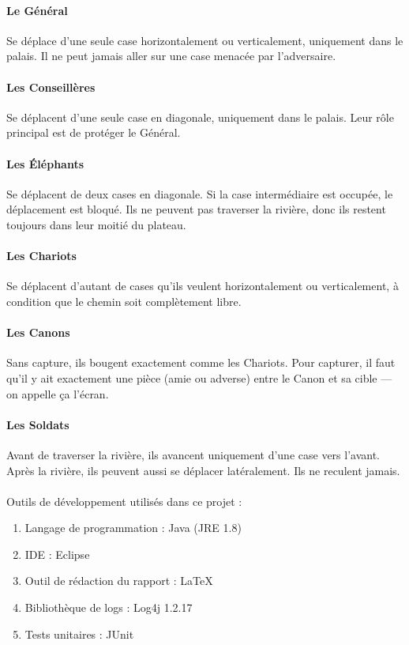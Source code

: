 \paragraph{Le Général} Se déplace d'une seule case horizontalement ou verticalement, uniquement dans le palais. Il ne peut jamais aller sur une case menacée par l'adversaire.
\paragraph{Les Conseillères} Se déplacent d'une seule case en diagonale, uniquement dans le palais. Leur rôle principal est de protéger le Général.
\paragraph{Les Éléphants} Se déplacent de deux cases en diagonale. Si la case intermédiaire est occupée, le déplacement est bloqué. Ils ne peuvent pas traverser la rivière, donc ils restent toujours dans leur moitié du plateau.
\paragraph{Les Chariots} Se déplacent d'autant de cases qu'ils veulent horizontalement ou verticalement, à condition que le chemin soit complètement libre.
\paragraph{Les Canons} Sans capture, ils bougent exactement comme les Chariots. Pour capturer, il faut qu'il y ait exactement une pièce (amie ou adverse) entre le Canon et sa cible — on appelle ça l'écran.
\paragraph{Les Soldats} Avant de traverser la rivière, ils avancent uniquement d'une case vers l'avant. Après la rivière, ils peuvent aussi se déplacer latéralement. Ils ne reculent jamais.
\paragraph{} Outils de développement utilisés dans ce projet :
\begin{enumerate}
\item Langage de programmation : Java (JRE 1.8)
\item IDE : Eclipse
\item Outil de rédaction du rapport : \LaTeX
\item Bibliothèque de logs : Log4j 1.2.17
\item Tests unitaires : JUnit
\end{enumerate}
